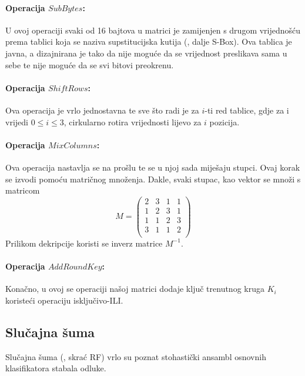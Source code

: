 \documentclass[times, utf8, diplomski]{fer}
\begin{document}
\paragraph{Operacija $SubBytes$:} U ovoj operaciji svaki od 16 bajtova u matrici je zamijenjen s drugom vrijednošću prema tablici koja se naziva supstitucijska kutija (, dalje S-Box). Ova tablica je javna, a dizajnirana je tako da nije moguće da se vrijednost preslikava sama u sebe te nije moguće da se svi bitovi preokrenu.

\paragraph{Operacija $ShiftRows$:} Ova operacija je vrlo jednostavna te sve što radi je za $i$-ti red tablice, gdje za i vrijedi $0 \le i \le 3$, cirkularno rotira vrijednosti lijevo za $i$ pozicija.

\paragraph{Operacija $MixColumns$:} Ova operacija nastavlja se na prošlu te se u njoj sada miješaju stupci. Ovaj korak se izvodi pomoću matričnog množenja. Dakle, svaki stupac, kao vektor se množi s matricom
\[
    M =
    \begin{pmatrix}
        2 & 3 & 1 & 1 \\
        1 & 2 & 3 & 1 \\
        1 & 1 & 2 & 3 \\
        3 & 1 & 1 & 2 \\
    \end{pmatrix}
\]
Prilikom dekripcije koristi se inverz matrice $M^{-1}$.

\paragraph{Operacija $AddRoundKey$:} Konačno, u ovoj se operaciji našoj matrici dodaje ključ trenutnog kruga $K_i$ koristeći operaciju isključivo-ILI.

\subsection{Slučajna šuma}

Slučajna šuma (, skrać RF) vrlo su poznat stohastički ansambl osnovnih klasifikatora stabala odluke.
\end{document}
